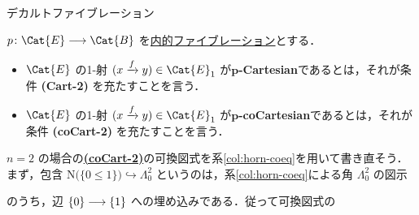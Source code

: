 \documentclass[TQFT_main]{subfiles}
\begin{document}
\begin{mydef}[label=def:Cart-coCart,breakable]{デカルトファイブレーション}
    \tcblower

    $p \colon \Cat{E} \lto \Cat{B}$ を\hyperref[def:infty-fib]{内的ファイブレーション}とする．
    \begin{itemize}
        \item $\Cat{E}$ の1-射 $(x \xrightarrow{f} y) \in \Cat{E}_1$ が\textbf{$\bm{p}$-Cartesian}であるとは，それが条件 \textsf{\textbf{(Cart-2)}} を充たすことを言う．
        \item $\Cat{E}$ の1-射 $(x \xrightarrow{f} y) \in \Cat{E}_1$ が\textbf{$\bm{p}$-coCartesian}であるとは，それが条件 \textsf{\textbf{(coCart-2)}} を充たすことを言う．
    \end{itemize}
\end{mydef}

$n=2$ の場合の\hyperref[def:Cart-coCart]{\textsf{\textbf{(coCart-2)}}}の可換図式を系\ref{col:horn-coeq}を用いて書き直そう．
まず，包含 $\mathrm{N}\bigl( \{0 \le 1\} \bigr) \hookrightarrow \Lambda^2_0$ というのは，系\ref{col:horn-coeq}による角 $\Lambda^2_0$ の図示
\begin{center}
\end{center}
のうち，辺 $\{0\} \longrightarrow \{1\}$ への埋め込みである．従って可換図式の
\begin{center}
\end{center}
\end{document}

